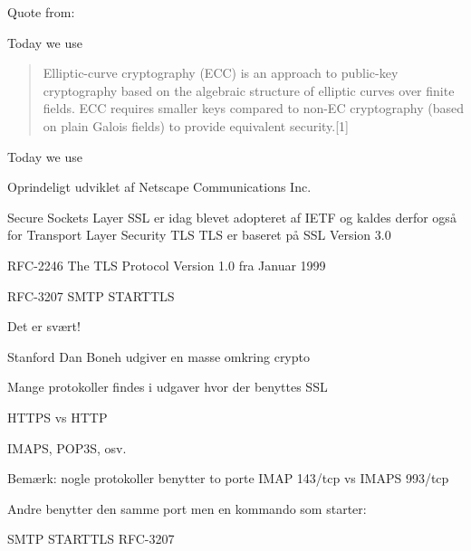 \documentclass[Screen16to9,17pt]{foils}
\begin{document}
\begin{list2}
\item Quote from: {\small {}}
\item Today we use 
\end{list2}


\begin{quote}
Elliptic-curve cryptography (ECC) is an approach to public-key cryptography based on the algebraic structure of elliptic curves over finite fields. ECC requires smaller keys compared to non-EC cryptography (based on plain Galois fields) to provide equivalent security.[1]
\end{quote}

\begin{list2}
\item Today we use 
\end{list2}





\begin{list1}
\item Oprindeligt udviklet af Netscape Communications Inc.
\item Secure Sockets Layer SSL er idag blevet adopteret af IETF og kaldes
derfor også for Transport Layer Security TLS
TLS er baseret på SSL Version 3.0
\item RFC-2246 The TLS Protocol Version 1.0 fra Januar 1999
\item RFC-3207 SMTP STARTTLS
\item Det er svært!
\item Stanford Dan Boneh udgiver en masse omkring crypto\\ 
\end{list1}



\begin{list1}
\item Mange protokoller findes i udgaver hvor der benyttes SSL
\item HTTPS vs HTTP
\item IMAPS, POP3S, osv.
\item Bemærk: nogle protokoller benytter to porte IMAP 143/tcp vs IMAPS 993/tcp
\item Andre benytter den samme port men en kommando som starter:
\item SMTP STARTTLS RFC-3207
\end{list1}
\end{document}
